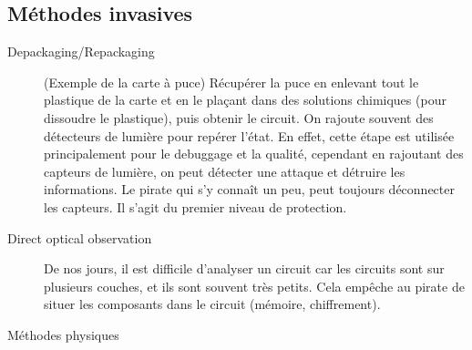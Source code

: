 \documentclass[a4paper,12pt]{article}
\begin{document}
\subsection{Méthodes invasives}
\begin{description}
\item[Depackaging/Repackaging] (Exemple de la carte à puce) Récupérer la puce en enlevant tout le plastique de la carte et en le plaçant dans des solutions chimiques (pour dissoudre le plastique), puis obtenir le circuit. On rajoute souvent des détecteurs de lumière pour repérer l'état. En effet, cette étape est utilisée principalement pour le debuggage et la qualité, cependant en rajoutant des capteurs de lumière, on peut détecter une attaque et détruire les informations. Le pirate qui s'y connaît un peu, peut toujours déconnecter les capteurs. Il s'agit du premier niveau de protection.

\item[Direct optical observation] De nos jours, il est difficile d'analyser un circuit car les circuits sont sur plusieurs couches, et ils sont souvent très petits. Cela empêche au pirate de situer les composants dans le circuit (mémoire, chiffrement).
\end{description}
\large{Méthodes physiques}
\normalsize
\end{document}
